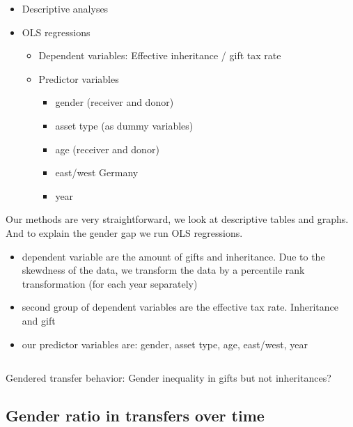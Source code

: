 \documentclass[
  letterpaper,
  DIV=11,
  numbers=noendperiod]{scrartcl}
\providecommand{\tightlist}{%
  \setlength{\itemsep}{0pt}\setlength{\parskip}{0pt}}\usepackage{longtable,booktabs,array}
\begin{document}
\begin{itemize}
\item
  Descriptive analyses
\item
  OLS regressions

  \begin{itemize}
  \item
    Dependent variables: Effective inheritance / gift tax rate
  \item
    Predictor variables

    \begin{itemize}
    \tightlist
    \item
      gender (receiver and donor)
    \item
      asset type (as dummy variables)
    \item
      age (receiver and donor)
    \item
      east/west Germany
    \item
      year
    \end{itemize}
  \end{itemize}
\end{itemize}

Our methods are very straightforward, we look at descriptive tables and
graphs. And to explain the gender gap we run OLS regressions.

\begin{itemize}
\item
  dependent variable are the amount of gifts and inheritance. Due to the
  skewdness of the data, we transform the data by a percentile rank
  transformation (for each year separately)
\item
  second group of dependent variables are the effective tax rate.
  Inheritance and gift
\item
  our predictor variables are: gender, asset type, age, east/west, year
\end{itemize}

\hypertarget{section}{%
\subsection{}\label{section}}

{Gendered transfer behavior: Gender inequality in gifts but not
inheritances?}

\hypertarget{gender-ratio-in-transfers-over-time}{%
\subsection{Gender ratio in transfers over
time}\label{gender-ratio-in-transfers-over-time}}
\end{document}
